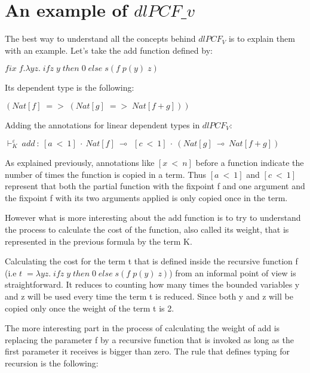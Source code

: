 \documentclass[a4paper,12pt]{article}
\begin{document}
\section{An example of $ dlPCF\_{v} $}

The best way to understand all the concepts behind $ dlPCF_{V} $ is to
explain them with an example. Let's take the add function defined by:

\begin{center}
$fix\;f.\lambda yz.\;ifz\;y\;then\;0\;else\;s(f\;p(y)\;z)$
\end{center}

Its dependent type is the following:

\begin{center}
$(Nat[f]\; =>\;(Nat[g]\; =>\;Nat[f + g]))$
\end{center}

Adding the annotations for linear dependent types in $ dlPCF_{V} $:

\begin{center}
$\vdash^{\varepsilon}_{K}~add~:~[a~<~1]~\cdot~Nat[f]~\multimap~~[c~<~1]~\cdot~(Nat[g]~\multimap~Nat[f + g])$
\end{center}

As explained previously, annotations like $[x~<~n]$ before a function
indicate the number of times the function is copied in a term. Thus
$[a~<~1]$ and $[c~<~1]$ represent that both the partial function with
the fixpoint f and one argument and the fixpoint f with its two
arguments applied is only copied once in the term.

However what is more interesting about the add function is to try to
understand the process to calculate the cost of the function, also
called its weight, that is represented in the previous formula by the
term K. 

Calculating the cost for the term t that is defined inside the
recursive function f (i.e $t\;=\lambda
yz.\;ifz\;y\;then\;0\;else\;s(f\;p(y)\;z)$) from an informal point of
view is straightforward. It reduces to counting how many times the
bounded variables y and z will be used every time the term t is
reduced. Since both y and z will be copied only once the weight of the
term t is 2.

The more interesting part in the process of calculating the weight of
add is replacing the parameter f by a recursive function that is
invoked as long as the first parameter it receives is bigger than
zero. The rule that defines typing for recursion is the following:
\end{document}
